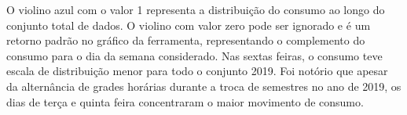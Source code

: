    	        O violino azul com o valor 1 representa a distribuição do consumo ao longo do conjunto total de dados.
    	        O violino com valor zero pode ser ignorado e é um retorno padrão no gráfico da ferramenta, representando o complemento do consumo para o dia da semana considerado.
    	        Nas sextas feiras, o consumo teve escala de distribuição menor para todo o conjunto 2019. Foi notório que apesar da alternância de grades horárias durante a troca de semestres no ano de 2019, os dias de terça e quinta feira concentraram o maior movimento de consumo.
    	      { \begin{center}    
    	        \begin{minipage}[c]{0.45\textwidth}
    	         \begin{figure}[H]
                \end{figure}\end{minipage} \hfill %
                \begin{minipage}[c]{0.45\textwidth}
                \begin{figure}[H]

\end{figure}
\end{minipage}
\end{center}}
